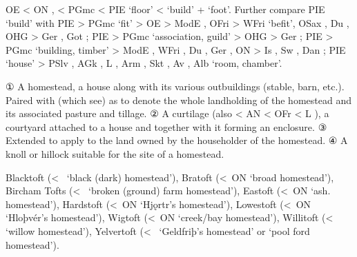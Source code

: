 \documentclass[12pt,letterpaper,oneside,article,draft]{memoir}
\begin{document}
\begin{Lemma}
\begin{Etymology}
	OE  < ON ,  < PGmc  < PIE  ‘floor’
		<  ‘build’ +  ‘foot’.
	Further compare PIE  ‘build’ with
	PIE  > PGmc  ‘fit’ > OE  > ModE ,
		OFri  > WFri  ‘befit’,
		OSax , Du , OHG  > Ger ,
		Got  ;
	PIE  > PGmc  ‘association, guild’ > OHG  > Ger ;
	PIE  > PGmc  ‘building, timber’ > ModE , WFri ,
		Du , Ger , ON  > Is , Sw , Dan ;
	PIE  ‘house’ > PSlv , AGk  ,
		L , Arm  , Skt  ,
		Av  , Alb  ‘room, chamber’.
\end{Etymology}
\begin{Definitions}
	① A homestead, a house along with its various outbuildings (stable, barn, etc.). Paired with
		 (which see) as  to denote the whole landholding of the
		homestead and its associated pasture and tillage.
	② A curtilage (also  < AN  < OFr  < L ),
		a courtyard attached to a house and together with it forming an enclosure.
	③ Extended to apply to the land owned by the householder of the homestead.
	④ A knoll or hillock suitable for the site of a homestead.
\end{Definitions}
\begin{Examples}
	Blacktoft (<~ ‘black (dark) homestead’), Bratoft (<~ON  ‘broad homestead’), Bircham Tofts (<~ ‘broken (ground) farm homestead’), Eastoft (<~ON  ‘ash. homestead’), Hardstoft (<~ON  ‘Hjǫrtr’s homestead’), Lowestoft (<~ON  ‘Hloþvér’s homestead’), Wigtoft (<~ON  ‘creek/bay homestead’), Willitoft (<~ ‘willow homestead’), Yelvertoft (<~ ‘Geldfriþ’s homestead’ or  ‘pool ford homestead’).
\end{Examples}
\end{Lemma}
\end{document}
